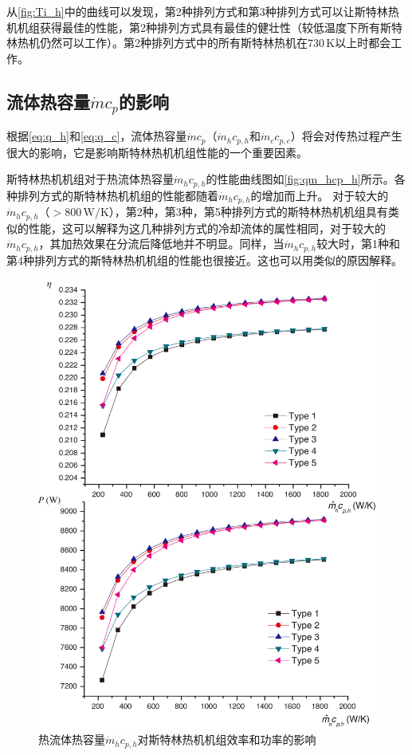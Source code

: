 从\autoref{fig:Ti_h}中的曲线可以发现，第2种排列方式和第3种排列方式可以让斯特林热机机组获得最佳的性能，第2种排列方式具有最佳的健壮性（较低温度下所有斯特林热机仍然可以工作）。第2种排列方式中的所有斯特林热机在$730\,\mathrm{K}$以上时都会工作。

\subsection{流体热容量$\dot{m}c_p$的影响}

根据\autoref{eq:q_h}和\autoref{eq:q_c}，流体热容量$\dot{m}c_p$（$\dot{m}_hc_{p,h}$和$\dot{m}_cc_{p,c}$）将会对传热过程产生很大的影响，它是影响斯特林热机机组性能的一个重要因素。

斯特林热机机组对于热流体热容量$\dot{m}_hc_{p,h}$的性能曲线图如\autoref{fig:qm_hcp_h}所示。各种排列方式的斯特林热机机组的性能都随着$\dot{m}_hc_{p,h}$的增加而上升。
对于较大的$\dot{m}_hc_{p,h}$（$> 800\,\mathrm{W/K}$），第2种，第3种，第5种排列方式的斯特林热机机组具有类似的性能，这可以解释为这几种排列方式的冷却流体的属性相同，对于较大的$\dot{m}_hc_{p,h}$，其加热效果在分流后降低地并不明显。同样，当$\dot{m}_hc_{p,h}$较大时，第1种和第4种排列方式的斯特林热机机组的性能也很接近。这也可以用类似的原因解释。

\begin{figure}[htbp]
\centering
	\includegraphics[width = 0.95\columnwidth]{fig/qm_hcp_h}
	\caption{热流体热容量$\dot{m}_hc_{p,h}$对斯特林热机机组效率和功率的影响}
	\label{fig:qm_hcp_h}
\end{figure}

